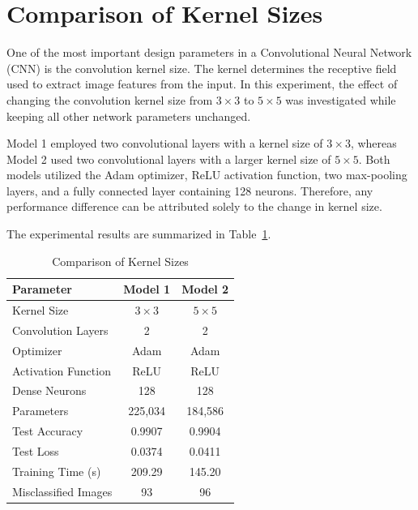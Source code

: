 
\section{Comparison of Kernel Sizes}

One of the most important design parameters in a Convolutional Neural Network (CNN) is the convolution kernel size. The kernel determines the receptive field used to extract image features from the input. In this experiment, the effect of changing the convolution kernel size from $3\times3$ to $5\times5$ was investigated while keeping all other network parameters unchanged.

Model 1 employed two convolutional layers with a kernel size of $3\times3$, whereas Model 2 used two convolutional layers with a larger kernel size of $5\times5$. Both models utilized the Adam optimizer, ReLU activation function, two max-pooling layers, and a fully connected layer containing 128 neurons. Therefore, any performance difference can be attributed solely to the change in kernel size.

The experimental results are summarized in Table~\ref{tab:kernelcomparison}.

\begin{table}[H]
\centering
\caption{Comparison of Kernel Sizes}\label{tab:kernelcomparison}

\begin{tabular}{lcc}
\toprule
\textbf{Parameter} & \textbf{Model 1} & \textbf{Model 2} \\
\midrule
Kernel Size & $3\times3$ & $5\times5$\\
Convolution Layers & 2 & 2\\
Optimizer & Adam & Adam\\
Activation Function & ReLU & ReLU\\
Dense Neurons & 128 & 128\\
Parameters & 225,034 & 184,586\\
Test Accuracy & 0.9907 & 0.9904\\
Test Loss & 0.0374 & 0.0411\\
Training Time (s) & 209.29 & 145.20\\
Misclassified Images & 93 & 96\\
\bottomrule
\end{tabular}

\end{table}

